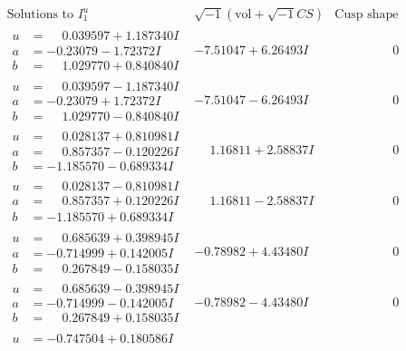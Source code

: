 \documentclass[1p]{elsarticle_modified}
\theoremstyle{definition}
\newcommand{\I}{\sqrt{-1}}
\begin{document}
$$\begin{array}{c|c|c}
\text{Solutions to }I^u_{1}& \I (\text{vol} + \sqrt{-1}CS) & \text{Cusp shape}\\
 \hline 
\begin{aligned}
u &= \phantom{-}0.039597 + 1.187340 I \\
a &= -0.23079 - 1.72372 I \\
b &= \phantom{-}1.029770 + 0.840840 I\end{aligned}
 & -7.51047 + 6.26493 I & \phantom{-0.000000 } 0 \\ \hline\begin{aligned}
u &= \phantom{-}0.039597 - 1.187340 I \\
a &= -0.23079 + 1.72372 I \\
b &= \phantom{-}1.029770 - 0.840840 I\end{aligned}
 & -7.51047 - 6.26493 I & \phantom{-0.000000 } 0 \\ \hline\begin{aligned}
u &= \phantom{-}0.028137 + 0.810981 I \\
a &= \phantom{-}0.857357 - 0.120226 I \\
b &= -1.185570 - 0.689334 I\end{aligned}
 & \phantom{-}1.16811 + 2.58837 I & \phantom{-0.000000 } 0 \\ \hline\begin{aligned}
u &= \phantom{-}0.028137 - 0.810981 I \\
a &= \phantom{-}0.857357 + 0.120226 I \\
b &= -1.185570 + 0.689334 I\end{aligned}
 & \phantom{-}1.16811 - 2.58837 I & \phantom{-0.000000 } 0 \\ \hline\begin{aligned}
u &= \phantom{-}0.685639 + 0.398945 I \\
a &= -0.714999 + 0.142005 I \\
b &= \phantom{-}0.267849 - 0.158035 I\end{aligned}
 & -0.78982 + 4.43480 I & \phantom{-0.000000 } 0 \\ \hline\begin{aligned}
u &= \phantom{-}0.685639 - 0.398945 I \\
a &= -0.714999 - 0.142005 I \\
b &= \phantom{-}0.267849 + 0.158035 I\end{aligned}
 & -0.78982 - 4.43480 I & \phantom{-0.000000 } 0 \\ \hline\begin{aligned}
u &= -0.747504 + 0.180586 I \\

\end{aligned}
\end{array}$$
\end{document}
